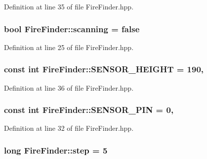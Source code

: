 Definition at line 35 of file Fire\-Finder.\-hpp.

\hypertarget{classFireFinder_aec1a3ae4b80847a907898601c64386cb}{
\subsubsection[{scanning}]{\setlength{\rightskip}{0pt plus 5cm}bool Fire\-Finder\-::scanning = false\hspace{0.3cm}{\ttfamily [private]}}}\label{classFireFinder_aec1a3ae4b80847a907898601c64386cb}


Definition at line 25 of file Fire\-Finder.\-hpp.

\hypertarget{classFireFinder_ab145c886fc3edcc215a5673bf4874b13}{
\subsubsection[{S\-E\-N\-S\-O\-R\-\_\-\-H\-E\-I\-G\-H\-T}]{\setlength{\rightskip}{0pt plus 5cm}const int Fire\-Finder\-::\-S\-E\-N\-S\-O\-R\-\_\-\-H\-E\-I\-G\-H\-T = 190\hspace{0.3cm}{\ttfamily [static]}, {\ttfamily [private]}}}\label{classFireFinder_ab145c886fc3edcc215a5673bf4874b13}


Definition at line 36 of file Fire\-Finder.\-hpp.

\hypertarget{classFireFinder_a5afc5290c8ba58893228414ba5965ed3}{
\subsubsection[{S\-E\-N\-S\-O\-R\-\_\-\-P\-I\-N}]{\setlength{\rightskip}{0pt plus 5cm}const int Fire\-Finder\-::\-S\-E\-N\-S\-O\-R\-\_\-\-P\-I\-N = 0\hspace{0.3cm}{\ttfamily [static]}, {\ttfamily [private]}}}\label{classFireFinder_a5afc5290c8ba58893228414ba5965ed3}


Definition at line 32 of file Fire\-Finder.\-hpp.

\hypertarget{classFireFinder_ad482526cf32997919cbc31f61d12065d}{
\subsubsection[{step}]{\setlength{\rightskip}{0pt plus 5cm}long Fire\-Finder\-::step = 5\hspace{0.3cm}{\ttfamily [private]}}}\label{classFireFinder_ad482526cf32997919cbc31f61d12065d}


